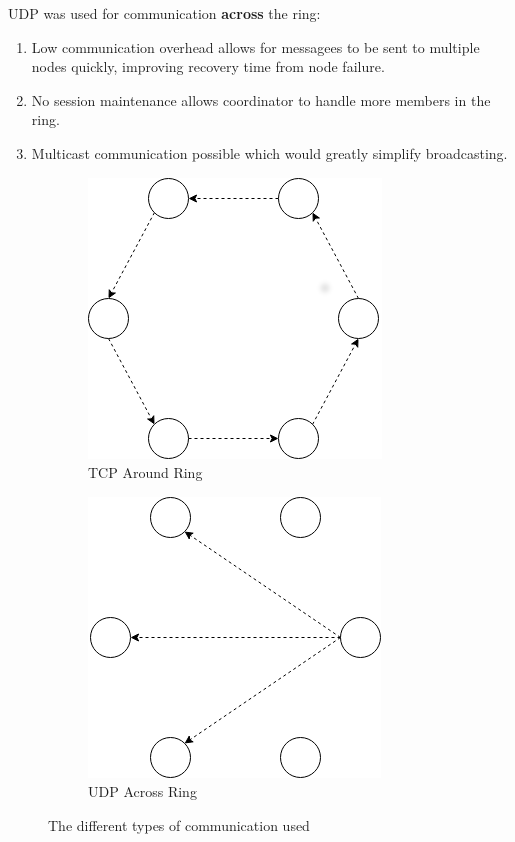 \documentclass[12pt]{article}
\begin{document}
\noindent UDP was used for communication \textbf{across} the ring: 
\begin{enumerate}
    \item Low communication overhead allows for messagees to be sent to multiple nodes quickly, improving recovery time from node failure.
    \item No session maintenance allows coordinator to handle more members in the ring.
    \item Multicast communication possible which would greatly simplify broadcasting.
\end{enumerate}

\begin{figure}[!h]
\centering
\begin{subfigure}{.5\textwidth}
  \centering
  \includegraphics[width=.6\linewidth]{images/tcp}
  \caption{TCP Around Ring}
  \label{fig:tcp}
\end{subfigure}%
\begin{subfigure}{.5\textwidth}
  \centering
  \includegraphics[width=.6\linewidth]{images/udp}
  \caption{UDP Across Ring}
  \label{fig:udp}
\end{subfigure}
\caption{The different types of communication used}
\label{fig:pattern}
\end{figure}
\end{document}
